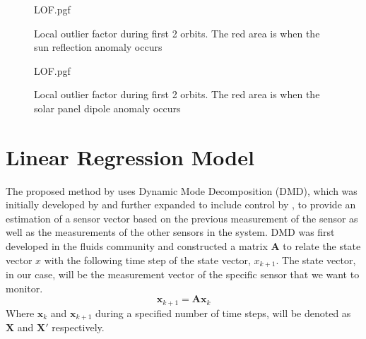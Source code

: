 \begin{figure}[!htb]
	\centering
	
	{LOF.pgf}
	
	\caption{Local outlier factor during first 2 orbits. The red area is when the sun reflection anomaly occurs}
	\label{fig:reflectionLOF}
\end{figure}

\begin{figure}[!htb]
	\centering
	
	{LOF.pgf}
	
	\caption{Local outlier factor during first 2 orbits. The red area is when the solar panel dipole anomaly occurs}
	\label{fig:solarPanelDipoleLOF}
\end{figure}


\section{Linear Regression Model}
The proposed method by \cite{DeSilva2020} uses Dynamic Mode Decomposition (DMD), which was initially developed by \cite{schmid2011applications} and further expanded to include control by \cite{proctor2016dynamic}, to provide an estimation of a sensor vector based on the previous measurement of the sensor as well as the measurements of the other sensors in the system. DMD was first developed in the fluids community and constructed a matrix $\mathbf{A}$ to relate the state vector $x$ with the following time step of the state vector, $x_{k+1}$. The state vector, in our case, will be the measurement vector of the specific sensor that we want to monitor.
\begin{equation}
	\mathbf{x}_{k+1} = \mathbf{Ax}_k
\end{equation}
Where $\mathbf{x}_k$ and $\mathbf{x}_{k+1}$ during a specified number of time steps, will be denoted as $\mathbf{X}$ and $\mathbf{X'}$ respectively.

